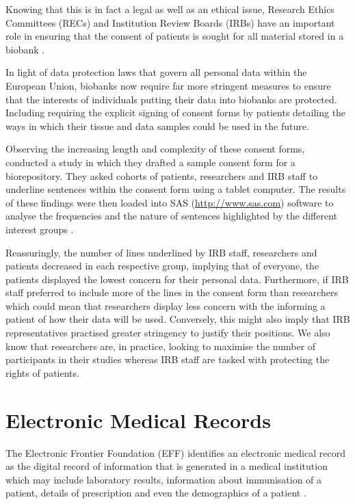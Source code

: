 \documentclass[british,a4paper, 12pt]{article}
\begin{document}
Knowing that this is in fact a legal as well as an ethical issue, Research Ethics 
Committees (RECs) and Institution Review Boards (IRBs) have an important role in 
ensuring that the consent of patients is sought for all material stored in a 
biobank \parencite{watson2010integrating}.

In light of data protection laws that govern all personal data within the European Union,
biobanks now require far more stringent measures to ensure that the interests of individuals
putting their data into biobanks are protected. Including requiring the explicit signing of
consent forms by patients detailing the ways in which their tissue and data samples could
be used in the future.

Observing the increasing length and complexity of these consent forms,
\citeauthor*{beskow2010simplifyinog} conducted a study in which they drafted a sample consent form
for a biorepository. They asked cohorts of patients, researchers and IRB staff to underline
sentences within the consent form using a tablet computer. The results of these findings were
then loaded into SAS (\url{http://www.sas.com}) software to analyse the frequencies and the nature
of sentences highlighted by the different interest groups \parencite{beskow2010simplifyinog}.

Reassuringly, the number of lines underlined by IRB staff, researchers and patients decreased in
each respective group, implying that of everyone, the patients displayed the lowest concern for
their personal data. Furthermore, if IRB staff preferred to include more of the lines in the
consent form than researchers which could mean that researchers display less concern with the
informing a patient of how their data will be used. Conversely, this might also imply that IRB
representatives practised greater stringency to justify their positions. We also know that
researchers are, in practice, looking to maximise the number of participants in their studies
whereas IRB staff are tasked with protecting the rights of patients.

\section{Electronic Medical Records}
The Electronic Frontier Foundation (EFF) identifies an electronic medical record as
the digital record of information that is generated in a medical institution which may
include laboratory results, information about immunisation of a patient,
details of prescription and even the demographics of a patient
\cite{effemrdefinition}.
\end{document}
